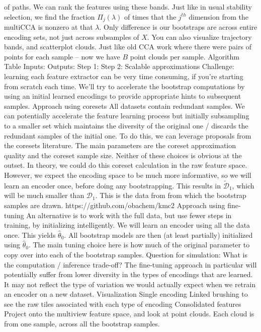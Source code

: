 \documentclass[11pt]{article}
\begin{document}
\begin{outline}
      of paths.
      \4 We can rank the features using these bands. Just like in usual
      stability selection, we find the fraction $\Pi_{j}\left(\lambda\right)$ of
      times that the $j^{th}$ dimension from the multiCCA is nonzero at that
      $\lambda$. Only difference is our bootstraps are across entire encoding
      sets, not just across subsamples of $X$.
      \4 You can also visualize trajectory bands, and scatterplot clouds. Just
      like old CCA work where there were pairs of points for each sample -- now
      we have $B$ point clouds per sample.
\1 Algorithm Table
  \2 Inputs:
  \2 Outputs:
  \2 Step 1:
  \2 Step 2:
\1 Scalable approximations
  \2 Challenge: learning each feature extractor can be very time consuming, if
  you're starting from scratch each time. We'll try to accelerate the bootstrap
  computations by using an initial learned encodings to provide appropriate
  hints to subsequent samples.
  \2 Approach using coresets
    \3 All datasets contain redundant samples. We can potentially accelerate the
    feature learning process but initially subsampling to a smaller set which
    maintains the diversity of the original one / discards the redundant samples
    of the initial one.
    \3 To do this, we can leverage proposals from the coresets literature. The
    main parameters are the coreset approximation quality and the coreset sample
    size. Neither of these choices is obvious at the outset.
    \3 In theory, we could do this coreset calculation in the raw feature space.
    However, we expect the encoding space to be much more informative, so we
    will learn an encoder once, before doing any bootstrapping.
      \4 This results in $\tilde{\mathcal{D}}_{1}$, which will be much smaller
      than $\mathcal{D}_{1}$.
      \4 This is the data from from which the bootstrap samples are drawn.
    \3 https://github.com/obachem/kmc2
  \2 Approach using fine-tuning
    \3 An alternative is to work with the full data, but use fewer steps in
    training, by initializing intelligently.
    \3 We will learn an encoder using all the data once. This yields
    $\hat{\theta}_{0}$.
    \3 All bootstrap models are then (at least partially) initialized using
    $\hat{\theta}_{0}$.
    \3 The main tuning choice here is how much of the original parameter to copy
    over into each of the bootstrap samples.
  \2 Question for simulation: What is the computation / inference trade-off?
    \3 The fine-tuning approach in particular will potentially suffer from
    lower diversity in the types of encodings that are learned. It may not
    reflect the type of variation we would actually expect when we retrain an
    encoder on a new dataset.
\1 Visualization
  \2 Single encoding
    \3 Linked brushing to see the raw tiles associated with each type of encoding
  \2 Consolidated features
    \3 Project onto the multiview feature space, and look at point clouds. Each
    cloud is from one sample, across all the bootstrap samples.
\end{outline}
\end{document}
